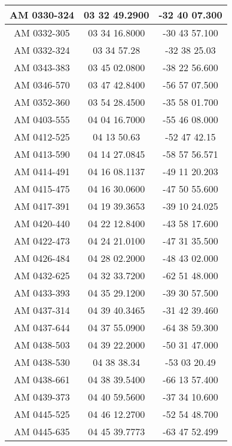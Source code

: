 \begin{apendicesenv}
\begin{longtable}{|c|c|c|}
            AM 0330-324 & 03 32 49.2900 & -32 40 07.300 \\ \hline
            AM 0332-305 & 03 34 16.8000 & -30 43 57.100 \\ \hline
            AM 0332-324 & 03 34 57.28 & -32 38 25.03 \\ \hline
            AM 0343-383 & 03 45 02.0800 & -38 22 56.600 \\ \hline
            AM 0346-570 & 03 47 42.8400 & -56 57 07.500 \\ \hline
            AM 0352-360 & 03 54 28.4500 & -35 58 01.700 \\ \hline
            AM 0403-555 & 04 04 16.7000 & -55 46 08.000 \\ \hline
            AM 0412-525 & 04 13 50.63 & -52 47 42.15 \\ \hline
            AM 0413-590 & 04 14 27.0845 & -58 57 56.571 \\ \hline
            AM 0414-491 & 04 16 08.1137 & -49 11 20.203 \\ \hline
            AM 0415-475 & 04 16 30.0600 & -47 50 55.600 \\ \hline
            AM 0417-391 & 04 19 39.3653 & -39 10 24.025 \\ \hline
            AM 0420-440 & 04 22 12.8400 & -43 58 17.600 \\ \hline
            AM 0422-473 & 04 24 21.0100 & -47 31 35.500 \\ \hline
            AM 0426-484 & 04 28 02.2000 & -48 43 02.000 \\ \hline
            AM 0432-625 & 04 32 33.7200 & -62 51 48.000 \\ \hline
            AM 0433-393 & 04 35 29.1200 & -39 30 57.500 \\ \hline
            AM 0437-314 & 04 39 40.3465 & -31 42 39.460 \\ \hline
            AM 0437-644 & 04 37 55.0900 & -64 38 59.300 \\ \hline
            AM 0438-503 & 04 39 22.2000 & -50 31 47.000 \\ \hline
            AM 0438-530 & 04 38 38.34 & -53 03 20.49 \\ \hline
            AM 0438-661 & 04 38 39.5400 & -66 13 57.400 \\ \hline
            AM 0439-373 & 04 40 59.5600 & -37 34 10.600 \\ \hline
            AM 0445-525 & 04 46 12.2700 & -52 54 48.700 \\ \hline
            AM 0445-635 & 04 45 39.7773 & -63 47 52.499 \\ \hline

\end{longtable}
\end{apendicesenv}
